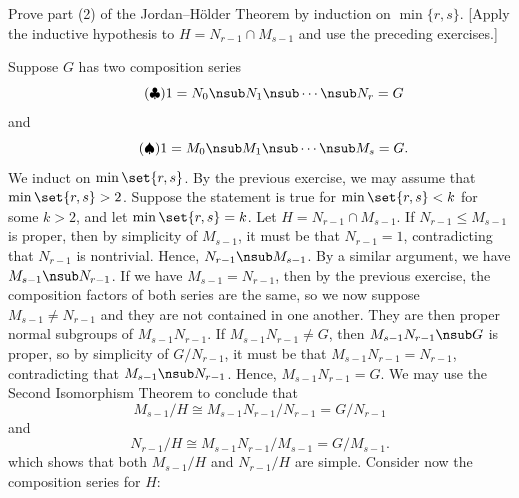 \begin{exercise}\label{ex3.4.10}
    Prove part (2) of the Jordan--H\"older Theorem by induction on $\min\{r,s\}$. [Apply the inductive hypothesis to $H = N_{r-1} \cap M_{s-1}$ and use the preceding exercises.]
\end{exercise}

\begin{sol}
    Suppose $G$ has two composition series
    \begin{equation}
        \label{eqclubsuit}
        \tag{$\clubsuit$}
        1 = N_0 \nsub N_1 \nsub \cdots \nsub N_r = G
    \end{equation}
    and
    \begin{equation}
        \label{eqspadesuit}
        \tag{$\spadesuit$}
        1 = M_0 \nsub M_1 \nsub \cdots \nsub M_s = G.
    \end{equation}
    We induct on $\min\set{r,s}$. By the previous exercise, we may assume that $\min\set{r, s} > 2$. Suppose the statement is true for $\min\set{r, s} < k$ for some $k > 2$, and let $\min\set{r, s} = k$. Let $H = N_{r - 1} \cap M_{s - 1}$. If $N_{r - 1} \leq M_{s - 1}$ is proper, then by simplicity of $M_{s - 1}$, it must be that $N_{r - 1} = 1$, contradicting that $N_{r - 1}$ is nontrivial. Hence, $N_{r - 1} \nsub M_{s - 1}$. By a similar argument, we have $M_{s - 1} \nsub N_{r - 1}$. If we have $M_{s - 1} = N_{r - 1}$, then by the previous exercise, the composition factors of both series are the same, so we now suppose $M_{s - 1} \neq N_{r - 1}$ and they are not contained 
    in one another. They are then proper normal subgroups of $M_{s - 1}N_{r - 1}$. If $M_{s - 1}N_{r - 1} \neq G$, then $M_{s - 1}N_{r - 1} \nsub G$ is proper, so by simplicity of $G/N_{r - 1}$, it must be that $M_{s - 1}N_{r - 1} = N_{r - 1}$, contradicting that $M_{s - 1} \nsub N_{r - 1}$. Hence, $M_{s - 1}N_{r - 1} = G$. We may use the Second Isomorphism Theorem to conclude that
    \begin{equation}
        \label{eqheartsuit}
        \tag{$\heartsuit$}
        M_{s - 1}/H \cong M_{s - 1}N_{r - 1}/N_{r - 1} = G/N_{r - 1}
    \end{equation}
    and
    \begin{equation}
        \label{eqdiamondsuit}
        \tag{$\diamondsuit$}
        N_{r - 1}/H \cong M_{s - 1}N_{r - 1}/M_{s - 1} = G/M_{s - 1}.
    \end{equation}
    which shows that both $M_{s - 1}/H$ and $N_{r - 1}/H$ are simple. Consider now the composition series for $H$:
    \begin{equation}

\end{equation}
\end{sol}
